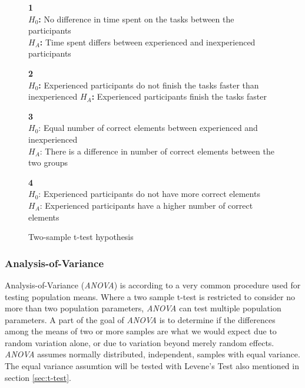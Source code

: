 \begin{figure}[H]
	\begin{framed}\centering
		\textbf{1}\\
		\textbf{$H_{0}$:} No difference in time spent on the tasks between the participants\\
		\textbf{$H_{A}$:} Time spent differs between experienced and inexperienced participants \newline
		
		\textbf{2}\\
		\textbf{$H_{0}$:} Experienced participants do not finish the tasks faster than inexperienced\newline
		\textbf{$H_{A}$:} Experienced participants finish the tasks faster\newline
		
		\textbf{3}\\
		$H_{0}$: Equal number of correct elements between experienced and inexperienced \\
		$H_{A}$: There is a difference in number of correct elements between the two groups\newline
		
		\textbf{4}\\
		$H_{0}$: Experienced participants do not have more correct elements\\
		$H_{A}$: Experienced participants have a higher number of correct elements\newline
	\end{framed}
	\caption{Two-sample t-test hypothesis}
	\label{fig:hypothesis_ttest}
\end{figure}

\subsubsection[ANOVA]{Analysis-of-Variance}\label{sec:anova}
Analysis-of-Variance (\textit{ANOVA}) is according to \cite{Walpole2012} a very common procedure used for testing population means. Where a two sample t-test is restricted to consider no more than two population parameters, \textit{ANOVA} can test multiple population parameters. A part of the goal of \textit{ANOVA} is to determine if the differences among the means of two or more samples are what we would expect due to random variation alone, or due to variation beyond merely random effects. \textit{ANOVA} assumes normally distributed, independent, samples with equal variance. The equal variance assumtion will be tested with Levene's Test also mentioned in section \ref{sec:t-test}. 

